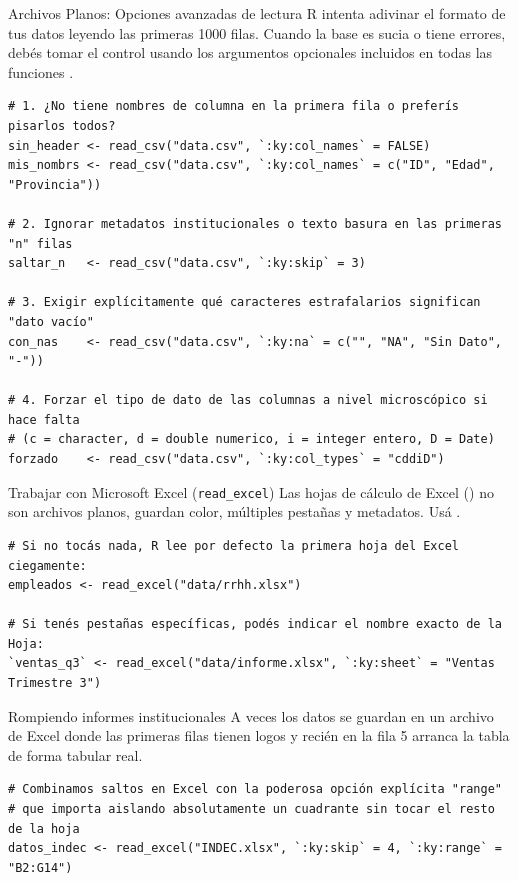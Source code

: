 \documentclass[8pt]{beamer}
\begin{document}
	\begin{frame}[fragile]{Archivos Planos: Opciones avanzadas de lectura}
		R intenta adivinar el formato de tus datos leyendo las primeras 1000 filas. Cuando la base es sucia o tiene errores, debés tomar el control usando los argumentos opcionales incluidos en todas las funciones .
		
\begin{lstlisting}[style=RScript]
# 1. ¿No tiene nombres de columna en la primera fila o preferís pisarlos todos?
sin_header <- read_csv("data.csv", `:ky:col_names` = FALSE)
mis_nombrs <- read_csv("data.csv", `:ky:col_names` = c("ID", "Edad", "Provincia"))

# 2. Ignorar metadatos institucionales o texto basura en las primeras "n" filas
saltar_n   <- read_csv("data.csv", `:ky:skip` = 3)

# 3. Exigir explícitamente qué caracteres estrafalarios significan "dato vacío"
con_nas    <- read_csv("data.csv", `:ky:na` = c("", "NA", "Sin Dato", "-"))

# 4. Forzar el tipo de dato de las columnas a nivel microscópico si hace falta
# (c = character, d = double numerico, i = integer entero, D = Date)
forzado    <- read_csv("data.csv", `:ky:col_types` = "cddiD")
\end{lstlisting}
	\end{frame}

	\begin{frame}[fragile]{Trabajar con Microsoft Excel (\texttt{read\_excel})}
		Las hojas de c\'alculo de Excel () no son archivos planos, guardan color, múltiples pestañas y metadatos. Usá .
		
\begin{lstlisting}[style=RScript]
# Si no tocás nada, R lee por defecto la primera hoja del Excel ciegamente:
empleados <- read_excel("data/rrhh.xlsx")

# Si tenés pestañas específicas, podés indicar el nombre exacto de la Hoja:
`ventas_q3` <- read_excel("data/informe.xlsx", `:ky:sheet` = "Ventas Trimestre 3")
\end{lstlisting}

		\begin{block}{Rompiendo informes institucionales}
A veces los datos se guardan en un archivo de Excel donde las primeras filas tienen logos y recién en la fila 5 arranca la tabla de forma tabular real.
\begin{lstlisting}[style=RScript]
# Combinamos saltos en Excel con la poderosa opción explícita "range" 
# que importa aislando absolutamente un cuadrante sin tocar el resto de la hoja
datos_indec <- read_excel("INDEC.xlsx", `:ky:skip` = 4, `:ky:range` = "B2:G14")
\end{lstlisting}
		\end{block}
	\end{frame}
\end{document}
